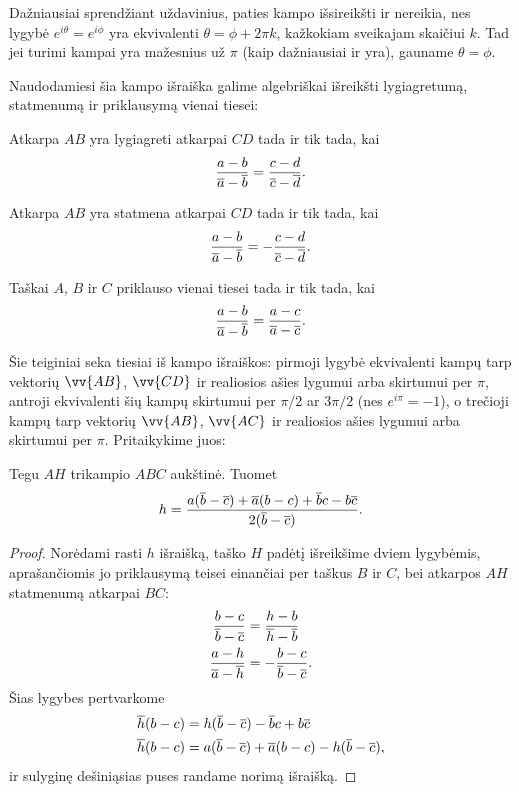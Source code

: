 \documentclass[11pt,a4paper,twoside]{book}
\begin{document}
Dažniausiai sprendžiant uždavinius, paties kampo išsireikšti ir nereikia, nes
lygybė $e^{i\theta} = e^{i\phi}$ yra ekvivalenti $\theta = \phi + 2\pi k$,
kažkokiam sveikajam skaičiui $k$. Tad jei turimi kampai yra mažesnius už $\pi$
(kaip dažniausiai ir yra), gauname $\theta = \phi$.

Naudodamiesi šia kampo išraiška galime algebriškai išreikšti lygiagretumą,
statmenumą ir priklausymą vienai tiesei:

\begin{teig}
  Atkarpa $AB$ yra lygiagreti atkarpai $CD$ tada ir tik tada, kai 
  $$
  \frac{a - b}{\overline{a} -\overline{b}}=\frac{c - d}{\overline{c} -
  \overline{d}}.
  $$
\end{teig}
\begin{teig}
  Atkarpa $AB$ yra statmena atkarpai $CD$ tada ir tik tada, kai 
  $$
  \frac{a - b}{\overline{a} -\overline{b}}=-\frac{c - d}{\overline{c} -
  \overline{d}}.
  $$
\end{teig}
\begin{teig}
  Taškai $A$, $B$ ir $C$ priklauso vienai tiesei tada ir tik tada, kai 
  $$
  \frac{a - b}{\overline{a} -\overline{b}}=\frac{a-c}{\overline{a} -
  \overline{c}}.
  $$
\end{teig}

Šie teiginiai seka tiesiai iš kampo išraiškos: pirmoji lygybė ekvivalenti kampų
tarp vektorių $\vv{AB}$, $\vv{CD}$ ir realiosios ašies lygumui arba skirtumui
per $\pi$, antroji ekvivalenti šių kampų skirtumui per $\pi/2$ ar $3\pi/2$ (nes
$e^{i\pi} = -1$), o trečioji kampų tarp vektorių $\vv{AB}$, $\vv{AC}$ ir
realiosios ašies lygumui arba skirtumui per $\pi$. Pritaikykime juos:

\begin{teig}
  Tegu $AH$ trikampio $ABC$ aukštinė. Tuomet 
  $$
  h = \frac{a(\overline{b} - \overline{c}) + \overline{a}(b - c) + \overline{b}c -b\overline{c}}{2(\overline{b} - \overline{c})}.
  $$
\end{teig}

\begin{proof}
  Norėdami rasti $h$ išraišką, taško $H$ padėtį išreikšime dviem lygybėmis,
  aprašančiomis jo priklausymą teisei einančiai per taškus $B$ ir $C$, bei
  atkarpos $AH$ statmenumą atkarpai $BC$:
  \begin{align*}
    \frac{b - c}{\overline{b} -\overline{c}} &= \frac{h - b}{\overline{h} - \overline{b}}\\
    \frac{a - h}{\overline{a} -\overline{h}} &=-\frac{b - c}{\overline{b} - \overline{c}}.
  \end{align*}
  Šias lygybes pertvarkome
  \begin{align*}
    \overline{h}(b - c) &= h(\overline{b} - \overline{c}) - \overline{b}c + b\overline{c} \\
    \overline{h}(b - c) &= a(\overline{b} - \overline{c}) + \overline{a}(b - c) - h(\overline{b} - \overline{c}),
  \end{align*}
  ir sulyginę dešiniąsias puses randame norimą išraišką.
\end{proof}
\end{document}
